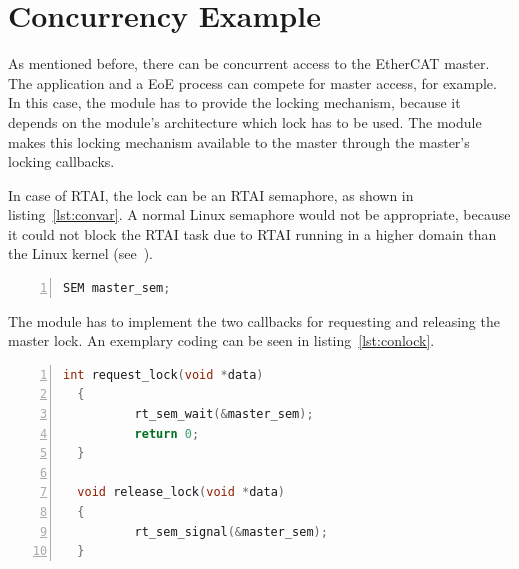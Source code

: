 \documentclass[a4paper,12pt,BCOR6mm,bibtotoc,idxtotoc]{scrbook}
\begin{document}

\section{Concurrency Example}
\label{sec:concurrency}

As mentioned before, there can be concurrent access to the EtherCAT master. The
application and a EoE process can compete for master access, for
example. In this case, the module has to provide the locking mechanism, because
it depends on the module's architecture which lock has to be used. The module
makes this locking mechanism available to the master through the master's
locking callbacks.

In case of RTAI, the lock can be an RTAI semaphore, as shown in
listing~\ref{lst:convar}. A normal Linux semaphore would not be appropriate,
because it could not block the RTAI task due to RTAI running in a higher domain
than the Linux kernel (see~\cite{rtai}).

\begin{lstlisting}[gobble=2,language=C,numbers=left,caption={RTAI semaphore for
    concurrent access},label={lst:convar}]
  SEM master_sem;
\end{lstlisting}

The module has to implement the two callbacks for requesting and
releasing the master lock. An exemplary coding can be seen in
listing~\ref{lst:conlock}.

\begin{lstlisting}[gobble=2,language=C,numbers=left,caption={RTAI locking
    callbacks for concurrent access},label={lst:conlock}]
  int request_lock(void *data)
  {
          rt_sem_wait(&master_sem);
          return 0;
  }

  void release_lock(void *data)
  {
          rt_sem_signal(&master_sem);
  }
\end{lstlisting}
\end{document}
